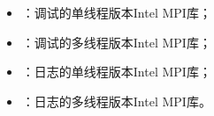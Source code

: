 \documentclass[a4paper,12pt,english]{sphinxmanual}
\begin{document}
\begin{itemize}
\begin{itemize}
\begin{itemize}
\item {} 
\sphinxAtStartPar
{}：调试的单线程版本Intel MPI库；

\item {} 
\sphinxAtStartPar
{}：调试的多线程版本Intel MPI库；

\item {} 
\sphinxAtStartPar
{}：日志的单线程版本Intel MPI库；

\item {} 
\sphinxAtStartPar
{}：日志的多线程版本Intel MPI库。

\end{itemize}

\end{itemize}

\end{itemize}
\end{document}
